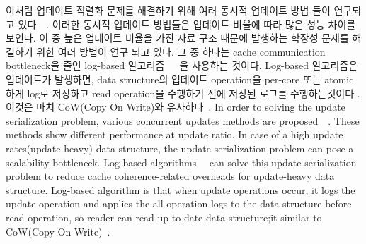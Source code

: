 \ifkor
이처럼 업데이트 직렬화 문제를 해결하기 위해 여러 동시적 업데이트 방법 들이 연구되고
있다~\cite{Arbel2014ConcurrentRCU}~\cite{Matveev2015RLU}.
이러한 동시적 업데이트 방법들은 업데이트 비율에 따라 많은 성능 차이를
보인다.
이 중 높은 업데이트 비율을 가진 자료 구조 때문에 발생하는 학장성 문제를 해결하기 위한 여러 방법이 연구 되고
있다.
그 중 하나는 cache communication bottleneck을 줄인 log-based
알고리즘~\cite{Shalev2006PLS}~\cite{Hendler2010FC}~\cite{SilasBoydWickizerPth}을
사용하는 것이다.
Log-based 알고리즘은 업데이트가 발생하면, data structure의 업데이트 operation을
per-core 또는 atomic하게 log로 저장하고 read operation을 수행하기 전에 저장된 로그를 수행하는것이다 .
이것은 마치 CoW(Copy On Write)와 유사하다~\cite{PaulDetailLWN}.
\else
In order to solving the update serialization problem, various concurrent updates
methods are proposed~\cite{Arbel2014ConcurrentRCU}~\cite{Matveev2015RLU}.
These methods show different performance at update ratio.
In case of a high update rates(update-heavy) data structure, the update
serialization problem can pose a scalability bottleneck.
Log-based algorithms~\cite{Hendler2010FC}~\cite{SilasBoydWickizerPth} can solve
this update serialization problem to reduce cache coherence-related overheads
for update-heavy data structure.
Log-based algorithm is that when update operations occur, it logs the update
operation and applies the all operation logs to the data structure
before read operation, so reader can read up to date data structure;it similar
to CoW(Copy On Write)~\cite{PaulDetailLWN}.

